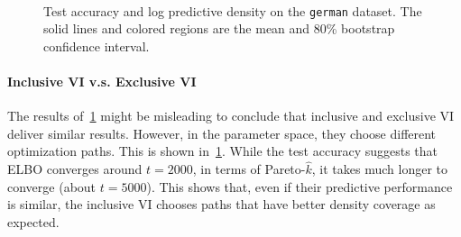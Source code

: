 \begin{figure}[H]
  \centering
    \\
  \caption{Test accuracy and log predictive density on the \texttt{german} dataset.
    The solid lines and colored regions are the mean and 80\% bootstrap confidence interval.
  }\label{fig:logistic}
  \vspace{-0.1in}
\end{figure}
%
\paragraph{Inclusive VI v.s. Exclusive VI}
The results of~\cref{fig:logistic} might be misleading to conclude that inclusive and exclusive VI deliver similar results.
However, in the parameter space, they choose different optimization paths.
This is shown in~\cref{fig:logistic}.
While the test accuracy suggests that ELBO converges around \(t=2000\), in terms of Pareto-\(\widehat{k}\), it takes much longer to converge (about \(t=5000\)).
This shows that, even if their predictive performance is similar, the inclusive VI chooses paths that have better density coverage as expected.

